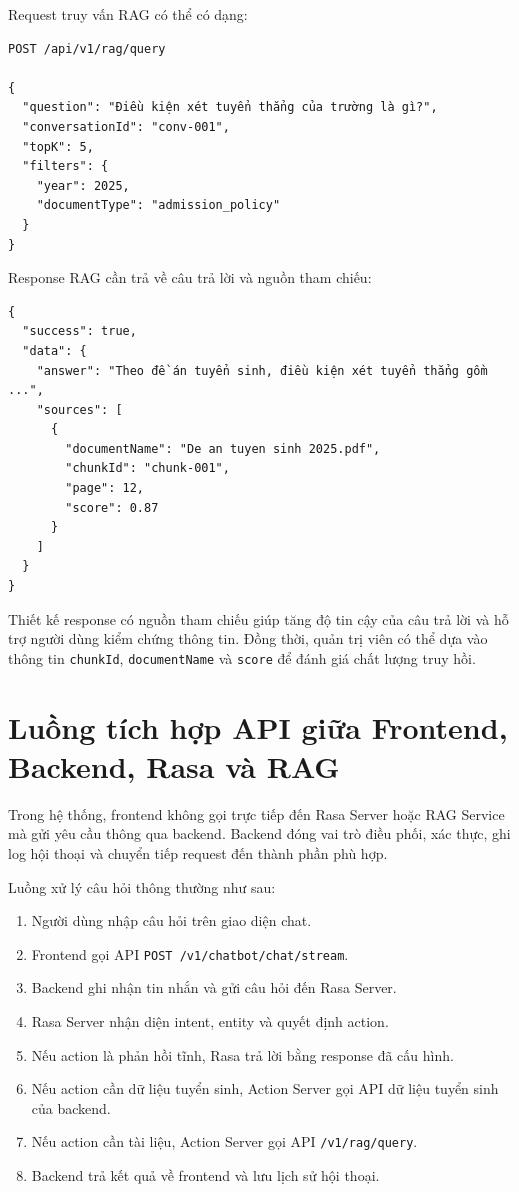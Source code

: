 \documentclass[12pt,a4paper]{report}
\begin{document}
Request truy vấn RAG có thể có dạng:

\begin{verbatim}
POST /api/v1/rag/query

{
  "question": "Điều kiện xét tuyển thẳng của trường là gì?",
  "conversationId": "conv-001",
  "topK": 5,
  "filters": {
    "year": 2025,
    "documentType": "admission_policy"
  }
}
\end{verbatim}

Response RAG cần trả về câu trả lời và nguồn tham chiếu:

\begin{verbatim}
{
  "success": true,
  "data": {
    "answer": "Theo đề án tuyển sinh, điều kiện xét tuyển thẳng gồm ...",
    "sources": [
      {
        "documentName": "De an tuyen sinh 2025.pdf",
        "chunkId": "chunk-001",
        "page": 12,
        "score": 0.87
      }
    ]
  }
}
\end{verbatim}

Thiết kế response có nguồn tham chiếu giúp tăng độ tin cậy của câu trả lời và hỗ trợ người dùng kiểm chứng thông tin. Đồng thời, quản trị viên có thể dựa vào thông tin \texttt{chunkId}, \texttt{documentName} và \texttt{score} để đánh giá chất lượng truy hồi.

\section{Luồng tích hợp API giữa Frontend, Backend, Rasa và RAG}

Trong hệ thống, frontend không gọi trực tiếp đến Rasa Server hoặc RAG Service mà gửi yêu cầu thông qua backend. Backend đóng vai trò điều phối, xác thực, ghi log hội thoại và chuyển tiếp request đến thành phần phù hợp.

Luồng xử lý câu hỏi thông thường như sau:

\begin{enumerate}
    \item Người dùng nhập câu hỏi trên giao diện chat.
    \item Frontend gọi API \texttt{POST /v1/chatbot/chat/stream}.
    \item Backend ghi nhận tin nhắn và gửi câu hỏi đến Rasa Server.
    \item Rasa Server nhận diện intent, entity và quyết định action.
    \item Nếu action là phản hồi tĩnh, Rasa trả lời bằng response đã cấu hình.
    \item Nếu action cần dữ liệu tuyển sinh, Action Server gọi API dữ liệu tuyển sinh của backend.
    \item Nếu action cần tài liệu, Action Server gọi API \texttt{/v1/rag/query}.
    \item Backend trả kết quả về frontend và lưu lịch sử hội thoại.
\end{enumerate}
\end{document}
